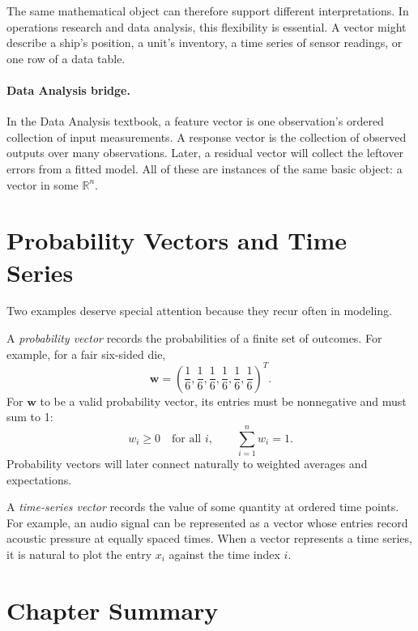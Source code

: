 The same mathematical object can therefore support different interpretations. In operations research and data analysis, this flexibility is essential. A vector might describe a ship's position, a unit's inventory, a time series of sensor readings, or one row of a data table.

\paragraph{Data Analysis bridge.}
In the Data Analysis textbook, a feature vector is one observation's ordered collection of input measurements. A response vector is the collection of observed outputs over many observations. Later, a residual vector will collect the leftover errors from a fitted model. All of these are instances of the same basic object: a vector in some \(\mathbb{R}^n\).

\section{Probability Vectors and Time Series}
\label{mf:probability-vectors}
\label{mf:time-series-vectors}

Two examples deserve special attention because they recur often in modeling.

A \emph{probability vector} records the probabilities of a finite set of outcomes. For example, for a fair six-sided die,
\[
\mathbf{w}=\left(\frac16,\frac16,\frac16,\frac16,\frac16,\frac16\right)^T.
\]
For \(\mathbf{w}\) to be a valid probability vector, its entries must be nonnegative and must sum to 1:
\[
 w_i\geq 0 \quad \text{for all } i,
 \qquad
 \sum_{i=1}^n w_i=1.
\]
Probability vectors will later connect naturally to weighted averages and expectations.

A \emph{time-series vector} records the value of some quantity at ordered time points. For example, an audio signal can be represented as a vector whose entries record acoustic pressure at equally spaced times. When a vector represents a time series, it is natural to plot the entry \(x_i\) against the time index \(i\).

\section{Chapter Summary}
\label{mf:vectors-summary}

